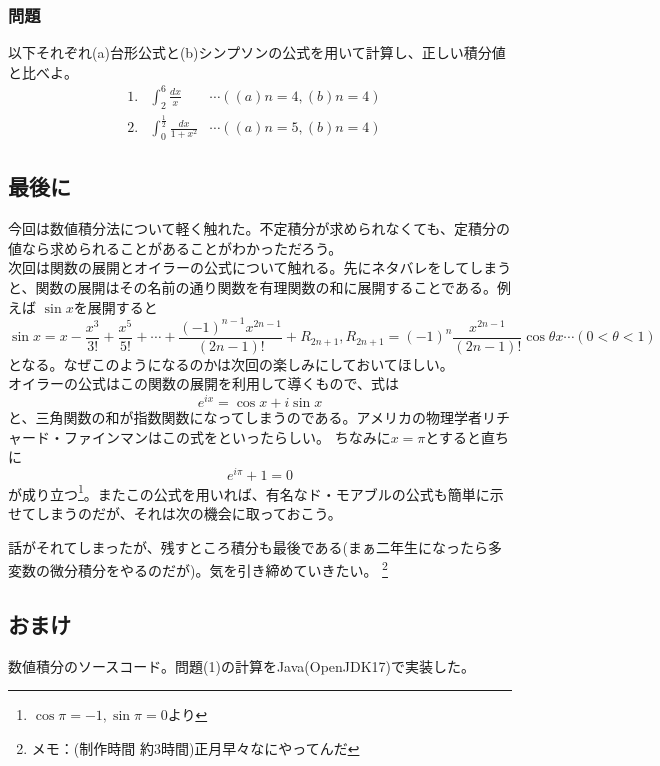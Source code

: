 \documentclass[a4j,dvipdfmx]{jsarticle}
\begin{document}
\subsubsection*{問題}
以下それぞれ(a)台形公式と(b)シンプソンの公式を用いて計算し、正しい積分値と比べよ。
\begin{align*}
    1.&\int_2^6\frac{dx}{x} &\cdots((a)n=4,(b)n=4)& \\
    2.&\int_0^{\frac{1}{2}}\frac{dx}{1+x^2} &\cdots((a)n=5,(b)n=4)&
\end{align*}
\newpage
\subsection*{最後に}
今回は数値積分法について軽く触れた。不定積分が求められなくても、定積分の値なら求められることがあることがわかっただろう。\\

次回は関数の展開とオイラーの公式について触れる。先にネタバレをしてしまうと、関数の展開はその名前の通り関数を有理関数の和に展開することである。例えば
$\sin x$を展開すると
\begin{equation*}
    \sin x=x-\frac{x^3}{3!}+\frac{x^5}{5!}+\cdots+\frac{(-1)^{n-1}x^{2n-1}}{(2n-1)!}+R_{2n+1},R_{2n+1}=(-1)^n\frac{x^{2n-1}}{(2n-1)!}\cos\theta x\cdots(0<\theta<1)
\end{equation*}
となる。なぜこのようになるのかは次回の楽しみにしておいてほしい。\\
オイラーの公式はこの関数の展開を利用して導くもので、式は
\begin{equation*}
    e^{ix}=\cos x+i\sin x
\end{equation*}
と、三角関数の和が指数関数になってしまうのである。アメリカの物理学者リチャード・ファインマンはこの式をといったらしい。
ちなみに$x=\pi$とすると直ちに
\begin{equation*}
    e^{i\pi}+1=0
\end{equation*}
が成り立つ\footnote{$\cos \pi=-1,\sin \pi=0$より}。またこの公式を用いれば、有名なド・モアブルの公式も簡単に示せてしまうのだが、それは次の機会に取っておこう。

話がそれてしまったが、残すところ積分も最後である(まぁ二年生になったら多変数の微分積分をやるのだが)。気を引き締めていきたい。
\footnote{メモ：(制作時間 約3時間)正月早々なにやってんだ}
\newpage
\subsection*{おまけ}
数値積分のソースコード。問題(1)の計算をJava(OpenJDK17)で実装した。
\end{document}
